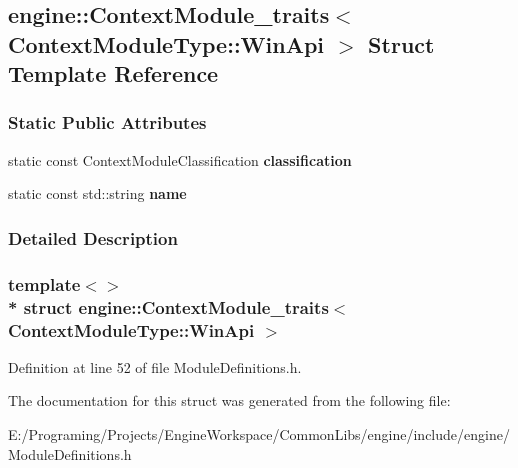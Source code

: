 \hypertarget{a00017}{}\subsection{engine\+:\+:Context\+Module\+\_\+traits$<$ Context\+Module\+Type\+:\+:Win\+Api $>$ Struct Template Reference}
\label{a00017}
\subsubsection*{Static Public Attributes}
\begin{DoxyCompactItemize}
\item 
static const Context\+Module\+Classification {\bfseries classification}\hypertarget{a00017_a655b512a8ed83e8d2b78642e9654cc99}{}\label{a00017_a655b512a8ed83e8d2b78642e9654cc99}

\item 
static const std\+::string {\bfseries name}\hypertarget{a00017_a1f9f8f5e908291aed01a5e0845208d23}{}\label{a00017_a1f9f8f5e908291aed01a5e0845208d23}

\end{DoxyCompactItemize}


\subsubsection{Detailed Description}
\subsubsection*{template$<$$>$\\*
struct engine\+::\+Context\+Module\+\_\+traits$<$ Context\+Module\+Type\+::\+Win\+Api $>$}



Definition at line 52 of file Module\+Definitions.\+h.



The documentation for this struct was generated from the following file\+:\begin{DoxyCompactItemize}
\item 
E\+:/\+Programing/\+Projects/\+Engine\+Workspace/\+Common\+Libs/engine/include/engine/Module\+Definitions.\+h\end{DoxyCompactItemize}
